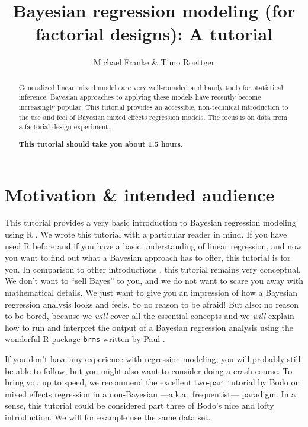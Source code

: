 \documentclass[nobib]{tufte-handout}
\title{Bayesian regression modeling (for factorial designs): A tutorial}
\author{Michael Franke \& Timo Roettger}
\date{}
\begin{document}
\maketitle

\begin{abstract}
  \noindent Generalized linear mixed models are very well-rounded and handy tools for statistical inference. Bayesian approaches to applying these models have recently become increasingly popular. This tutorial provides an accessible, non-technical introduction to the use and feel of Bayesian mixed effects regression models. The focus is on data from a factorial-design experiment. \\
  
  \medskip
  
  \noindent \textbf{This tutorial should take you about 1.5 hours.}
\end{abstract}

\section{Motivation \& intended audience}

This tutorial provides a very basic introduction to Bayesian regression modeling using R \citep{Manual}. We wrote this tutorial with a particular reader in mind. If you have used R before and if you have a basic understanding of linear regression, and now you want to find out what a Bayesian approach has to offer, this tutorial is for you. In comparison to other introductions \citep[e.g.][]{SorensenHohensteinb2016:Bayesian-linear}, this tutorial remains very conceptual. We don’t want to ``sell Bayes'' to you, and we do not want to scare you away with mathematical details. We just want to give you an impression of how a Bayesian regression analysis looks and feels. So no reason to be afraid! But also: no reason to be bored, because we \emph{will} cover all the essential concepts and we \emph{will} explain how to run and interpret the output of a Bayesian regression analysis using the wonderful R package \texttt{brms} written by Paul \citet{buerkner2016brms}.



If you don’t have any experience with regression modeling, you will probably still be able to follow, but you might also want to consider doing a crash course. To bring you up to speed, we recommend the excellent two-part tutorial by Bodo \citet{Winter2013:Linear-models-a} on mixed effects regression in a non-Bayesian ---a.k.a.~frequentist--- paradigm. In a sense, this tutorial could be considered part three of Bodo's nice and lofty introduction. We will for example use the same data set.
\end{document}
